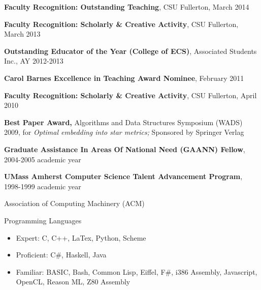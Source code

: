 \documentclass[11pt]{letter}
\begin{document}
\textbf{Faculty Recognition: Outstanding Teaching}, CSU Fullerton, March 2014

\textbf{Faculty Recognition: Scholarly \& Creative Activity}, CSU Fullerton, March 2013

\textbf{Outstanding Educator of the Year (College of ECS)}, Associated Students Inc., AY 2012-2013

\textbf{Carol Barnes Excellence in Teaching Award Nominee}, February 2011

\textbf{Faculty Recognition: Scholarly \& Creative Activity}, CSU Fullerton, April 2010

\textbf{Best Paper Award,} Algorithms and Data Structures Symposium (WADS) 2009, for \emph{Optimal embedding into star metrics;} Sponsored by Springer Verlag

\textbf{Graduate Assistance In Areas Of National Need (GAANN) Fellow}, 2004-2005 academic year

\textbf{UMass Amherst Computer Science Talent Advancement Program}, 1998-1999 academic year


Association of Computing Machinery (ACM) \\


Programming Languages
\begin{itemize}
\item Expert: C, C++, LaTex, Python, Scheme
\item Proficient: C\#, Haskell, Java
\item Familiar: BASIC, Bash, Common Lisp, Eiffel, F\#, i386 Assembly, Javascript, OpenCL, Reason ML, Z80 Assembly
\end{itemize}
\end{document}
